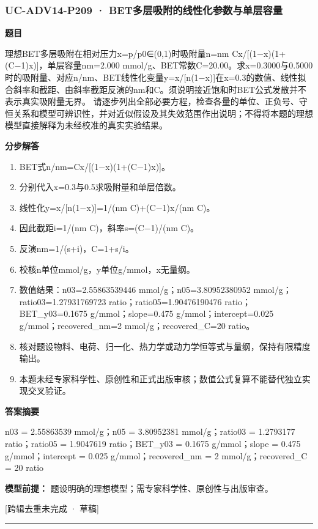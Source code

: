 \documentclass[UTF8,11pt,a4paper]{ctexart}
\begin{document}
\subsubsection*{UC-ADV14-P209 · BET多层吸附的线性化参数与单层容量}
\noindent\textbf{题目}\par
理想BET多层吸附在相对压力x=p/p0∈(0,1)时吸附量n=nm Cx/[(1−x)(1+(C−1)x)]，单层容量nm=2.000 mmol/g、BET常数C=20.00。求x=0.3000与0.5000时的吸附量、对应n/nm、BET线性化变量y=x/[n(1−x)]在x=0.3的数值、线性拟合斜率和截距、由斜率截距反演的nm和C。须说明接近饱和时BET公式发散并不表示真实吸附量无界。 请逐步列出全部必要方程，检查各量的单位、正负号、守恒关系和模型可辨识性，并对近似假设及其失效范围作出说明；不得将本题的理想模型直接解释为未经校准的真实实验结果。\par
\medskip\noindent\textbf{分步解答}
\begin{enumerate}
\item BET式n/nm=Cx/[(1−x)(1+(C−1)x)]。
\item 分别代入x=0.3与0.5求吸附量和单层倍数。
\item 线性化y=x/[n(1−x)]=1/(nm C)+(C−1)x/(nm C)。
\item 因此截距i=1/(nm C)，斜率s=(C−1)/(nm C)。
\item 反演nm=1/(s+i)，C=1+s/i。
\item 校核n单位mmol/g，y单位g/mmol，x无量纲。
\item 数值结果：n03=2.55863539446 mmol/g；n05=3.80952380952 mmol/g；ratio03=1.27931769723 ratio；ratio05=1.90476190476 ratio；BET\_y03=0.1675 g/mmol；slope=0.475 g/mmol；intercept=0.025 g/mmol；recovered\_nm=2 mmol/g；recovered\_C=20 ratio。
\item 核对题设物料、电荷、归一化、热力学或动力学恒等式与量纲，保持有限精度输出。
\item 本题未经专家科学性、原创性和正式出版审核；数值公式复算不能替代独立实现交叉验证。
\end{enumerate}
\noindent\textbf{答案摘要}\par
n03 = 2.55863539 mmol/g；n05 = 3.80952381 mmol/g；ratio03 = 1.2793177 ratio；ratio05 = 1.9047619 ratio；BET\_y03 = 0.1675 g/mmol；slope = 0.475 g/mmol；intercept = 0.025 g/mmol；recovered\_nm = 2 mmol/g；recovered\_C = 20 ratio\par
\noindent\textbf{模型前提：}
题设明确的理想模型；需专家科学性、原创性与出版审查。\par
\noindent\textcolor{red!65!black}{[跨辑去重未完成 · 草稿]} \par
\medskip\hrule\medskip
{}
\end{document}
